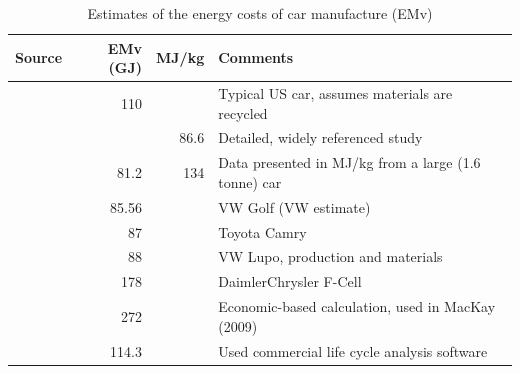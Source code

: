 \documentclass[a4paper, 11pt, twoside]{Thesis}
\begin{document}
\begin{table}[h]
\caption{Estimates of the energy costs of car manufacture (EMv)}
\begin{center}
 \begin{tabular}{p{3cm}rrp{6cm}}
 \toprule
 Source	& EMv (GJ)	&MJ/kg	&Comments\\
  \midrule
\citet{burnham2006development}	&110	&	&Typical US car, assumes materials are recycled\\
\citet{MacLean1998}	&	&86.6	&Detailed, widely referenced study\\
\citet{Mikkola201023}		&81.2	&134&Data presented in MJ/kg from a large (1.6 tonne) car\\
\citet{Simonsen2011}	&85.56	&	&VW Golf (VW estimate)\\
\citet{sorensen2004total}	&87	&	&Toyota Camry\\
\citet{sorensen2004total}	&88	&	&VW Lupo, production and materials\\
\citet{sorensen2004total}	&178	&	&DaimlerChrysler F-Cell\\
\citet{Treloar2004}	&272	&	&Economic-based calculation, used in MacKay (2009)\\
\citet{Uson2011-eco-eff}	&114.3	&	&Used commercial life cycle analysis software\\
\bottomrule
 \end{tabular}\end{center}
 \label{tcaren}
\end{table}
\end{document}
